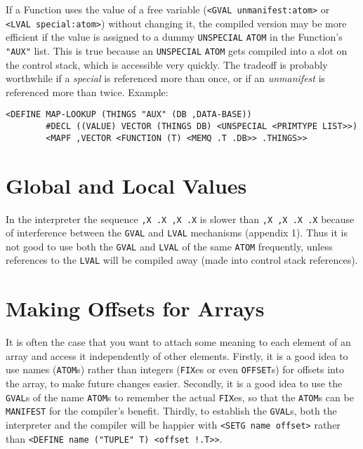 \documentclass[a4paper]{scrbook}
\begin{document}
If a Function uses the value of a free variable (\texttt{\textless{}GVAL\ unmanifest:atom\textgreater{}} or
\texttt{\textless{}LVAL\ special:atom\textgreater{}}) without changing it, the compiled version may be more efficient if
the value is assigned to a dummy \texttt{UNSPECIAL} \texttt{ATOM} in the Function's \texttt{"AUX"} list. This is true
because an \texttt{UNSPECIAL} \texttt{ATOM} gets compiled into a slot on the control stack, which is accessible very
quickly. The tradeoff is probably worthwhile if a \emph{special} is referenced more than once, or if an \emph{unmanifest}
is referenced more than twice. Example:

\begin{verbatim}
<DEFINE MAP-LOOKUP (THINGS "AUX" (DB ,DATA-BASE))
        #DECL ((VALUE) VECTOR (THINGS DB) <UNSPECIAL <PRIMTYPE LIST>>)
        <MAPF ,VECTOR <FUNCTION (T) <MEMQ .T .DB>> .THINGS>>
\end{verbatim}

\section{Global and Local Values}\label{global-and-local-values}

In the interpreter the sequence \texttt{,X\ .X\ ,X\ .X} is slower than \texttt{,X\ ,X\ .X\ .X} because of interference
between the \texttt{GVAL} and \texttt{LVAL} mechanisms (appendix 1). Thus it is
not good to use both the \texttt{GVAL} and \texttt{LVAL} of the same \texttt{ATOM} frequently, unless references to the
\texttt{LVAL} will be compiled away (made into control stack references).

\section{Making Offsets for Arrays}\label{making-offsets-for-arrays}

It is often the case that you want to attach some meaning to each element of an array and access it independently of other
elements. Firstly, it is a good idea to use names (\texttt{ATOM}s) rather than integers (\texttt{FIX}es or even
\texttt{OFFSET}s) for offsets into the array, to make future changes easier. Secondly, it is a good idea to use the
\texttt{GVAL}s of the name \texttt{ATOM}s to remember the actual \texttt{FIX}es, so that the \texttt{ATOM}s can be
\texttt{MANIFEST} for the compiler's benefit. Thirdly, to establish the \texttt{GVAL}s, both the interpreter and the
compiler will be happier with \texttt{\textless{}SETG\ name\ offset\textgreater{}} rather than
\texttt{\textless{}DEFINE\ name\ ("TUPLE"\ T)\ \textless{}offset\ !.T\textgreater{}\textgreater{}}.
\end{document}
